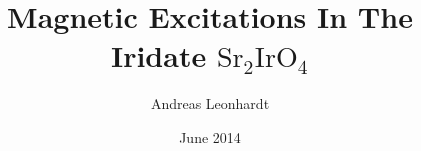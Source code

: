 \documentclass[twoside,english]{uiofysmaster}
\author{Andreas Leonhardt}
\title{Magnetic Excitations In The Iridate $\mathrm{Sr}_2\mathrm{IrO}_4$}
\date{June 2014}
\begin{document}
\begin{titlepage}
\maketitle
\end{titlepage}
\end{document}
